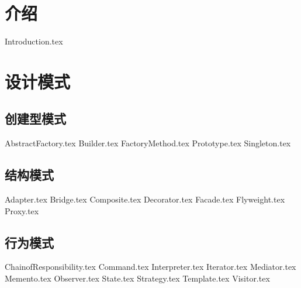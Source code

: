 \documentclass{PionpillNote-book}
\begin{document}
\date{\today}
\tableofcontents
\newpage

\setcounter{page}{1} 
\pagestyle{fancy}

\chapter{介绍}
{Introduction.tex}
\chapter{设计模式}
\section{创建型模式}
{AbstractFactory.tex}
{Builder.tex}
{FactoryMethod.tex}
{Prototype.tex}
{Singleton.tex}

\section{结构模式}
{Adapter.tex}
{Bridge.tex}
{Composite.tex}
{Decorator.tex}
{Facade.tex}
{Flyweight.tex}
{Proxy.tex}

\section{行为模式}
{ChainofResponsibility.tex}
{Command.tex}
{Interpreter.tex}
{Iterator.tex}
{Mediator.tex}
{Memento.tex}
{Observer.tex}
{State.tex}
{Strategy.tex}
{Template.tex}
{Visitor.tex}
\end{document}
